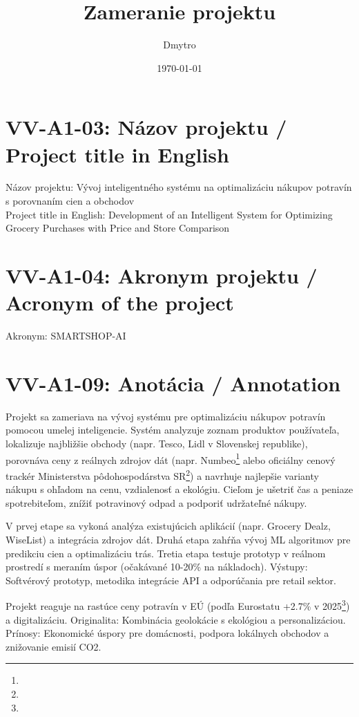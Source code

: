 \documentclass[a4paper,12pt]{article}
\begin{document}
\title{Zameranie projektu}
\author{Dmytro}
\date{\today}
\maketitle

\section*{VV-A1-03: Názov projektu / Project title in English}
Názov projektu: Vývoj inteligentného systému na optimalizáciu nákupov potravín s porovnaním cien a obchodov \\
Project title in English: Development of an Intelligent System for Optimizing Grocery Purchases with Price and Store Comparison

\section*{VV-A1-04: Akronym projektu / Acronym of the project}
Akronym: SMARTSHOP-AI

\section*{VV-A1-09: Anotácia / Annotation }
Projekt sa zameriava na vývoj  systému pre optimalizáciu nákupov potravín pomocou umelej inteligencie. 
Systém analyzuje zoznam produktov používateľa, lokalizuje najbližšie obchody (napr. Tesco, Lidl v Slovenskej republike), 
porovnáva ceny z reálnych zdrojov dát (napr. Numbeo\footnote{} alebo oficiálny cenový trackér Ministerstva pôdohospodárstva SR\footnote{}) 
a navrhuje najlepšie varianty nákupu s ohľadom na cenu, vzdialenosť a ekológiu. Cieľom je ušetriť čas a peniaze spotrebiteľom, 
znížiť potravinový odpad a podporiť udržateľné nákupy.

V prvej etape sa vykoná analýza existujúcich aplikácií (napr. Grocery Dealz, WiseList) a integrácia zdrojov dát. 
Druhá etapa zahŕňa vývoj ML algoritmov pre predikciu cien a optimalizáciu trás. 
Tretia etapa testuje prototyp v reálnom prostredí s meraním úspor (očakávané 10-20\% na nákladoch). 
Výstupy: Softvérový prototyp, metodika integrácie API a odporúčania pre retail sektor.

Projekt reaguje na rastúce ceny potravín v EÚ (podľa Eurostatu +2.7\% v 2025\footnote{}) a digitalizáciu. 
Originalita: Kombinácia geolokácie s ekológiou a personalizáciou. 
Prínosy: Ekonomické úspory pre domácnosti, podpora lokálnych obchodov a znižovanie emisií CO2.


\end{document}
